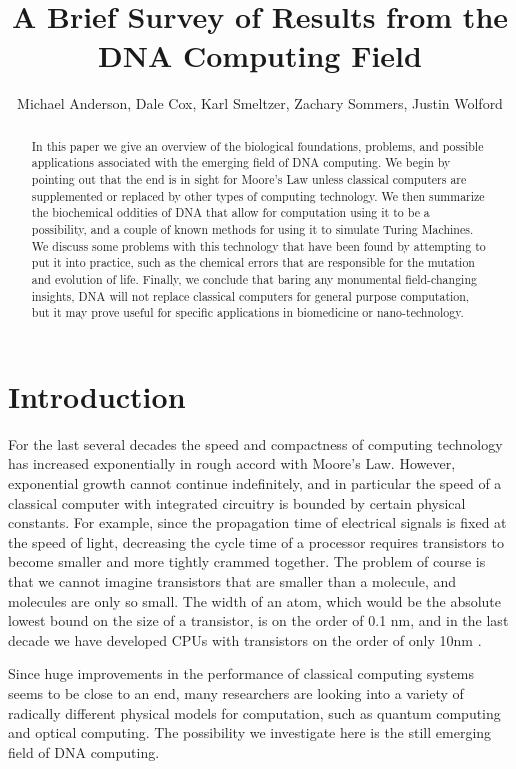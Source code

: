 \documentclass[twocolumn]{article}
\author{Michael Anderson, Dale Cox, Karl Smeltzer, Zachary Sommers,
Justin Wolford}
\title{A Brief Survey of Results from the DNA Computing Field}
\begin{document}
\maketitle
{}

\vspace{3em}

\begin{abstract}
In this paper we give an overview of the biological foundations, problems, and
possible applications associated with the emerging field of DNA computing. We
begin by pointing out that the end is in sight for Moore's Law unless classical
computers are supplemented or replaced by other types of computing technology.
We then summarize the biochemical oddities of DNA that allow for
computation using it to be a possibility, and a couple of known methods for
using it to simulate Turing Machines. We discuss some problems with this
technology that have been found by attempting to put it into practice, such as 
the chemical errors that are responsible for the mutation and evolution of
life. Finally, we conclude that baring any monumental field-changing insights,
DNA will not replace classical computers for general purpose computation, but
it may prove useful for specific applications in biomedicine or nano-technology.
\end{abstract}

\section{Introduction}
For the last several decades the speed and compactness of computing technology
has increased exponentially in rough accord with Moore's Law. However,
exponential growth cannot continue indefinitely, and in particular the speed of a
classical computer with integrated circuitry is bounded by certain physical
constants. For example, since the propagation time of electrical signals is
fixed at the speed of light, decreasing the cycle time of a processor requires
transistors to become smaller and more tightly crammed together. The problem of
course is that we cannot imagine transistors that are smaller than a molecule,
and molecules are only so small. The width of an atom, which would be the
absolute lowest bound on the size of a transistor, is on the order of 0.1 nm,
and in the last decade we have developed CPUs with transistors on the order of
only 10nm \cite{rama}.

Since huge improvements in the performance of classical computing systems
seems to be close to an end,
many researchers are looking into a variety of radically different physical
models for computation, such as quantum computing and optical computing. The
possibility we investigate here is the still emerging field of DNA computing.
\end{document}

